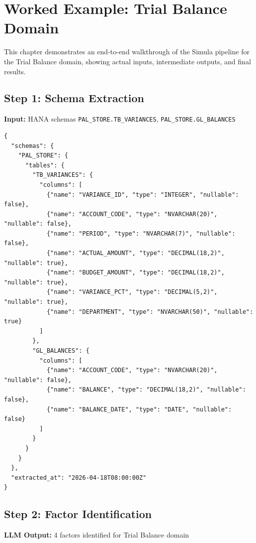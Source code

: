 \chapter{Worked Example: Trial Balance Domain}
\label{chap:worked-example}

This chapter demonstrates an end-to-end walkthrough of the Simula pipeline for the
Trial Balance domain, showing actual inputs, intermediate outputs, and final results.
\label{sec:worked-example}

\section{Step 1: Schema Extraction}

\textbf{Input:} HANA schemas \texttt{PAL\_STORE.TB\_VARIANCES}, \texttt{PAL\_STORE.GL\_BALANCES}

\begin{lstlisting}[language=jsonx,caption={Schema extraction output (schemas.json)}]
{
  "schemas": {
    "PAL_STORE": {
      "tables": {
        "TB_VARIANCES": {
          "columns": [
            {"name": "VARIANCE_ID", "type": "INTEGER", "nullable": false},
            {"name": "ACCOUNT_CODE", "type": "NVARCHAR(20)", "nullable": false},
            {"name": "PERIOD", "type": "NVARCHAR(7)", "nullable": false},
            {"name": "ACTUAL_AMOUNT", "type": "DECIMAL(18,2)", "nullable": true},
            {"name": "BUDGET_AMOUNT", "type": "DECIMAL(18,2)", "nullable": true},
            {"name": "VARIANCE_PCT", "type": "DECIMAL(5,2)", "nullable": true},
            {"name": "DEPARTMENT", "type": "NVARCHAR(50)", "nullable": true}
          ]
        },
        "GL_BALANCES": {
          "columns": [
            {"name": "ACCOUNT_CODE", "type": "NVARCHAR(20)", "nullable": false},
            {"name": "BALANCE", "type": "DECIMAL(18,2)", "nullable": false},
            {"name": "BALANCE_DATE", "type": "DATE", "nullable": false}
          ]
        }
      }
    }
  },
  "extracted_at": "2026-04-18T08:00:00Z"
}
\end{lstlisting}

\section{Step 2: Factor Identification}

\textbf{LLM Output:} 4 factors identified for Trial Balance domain

